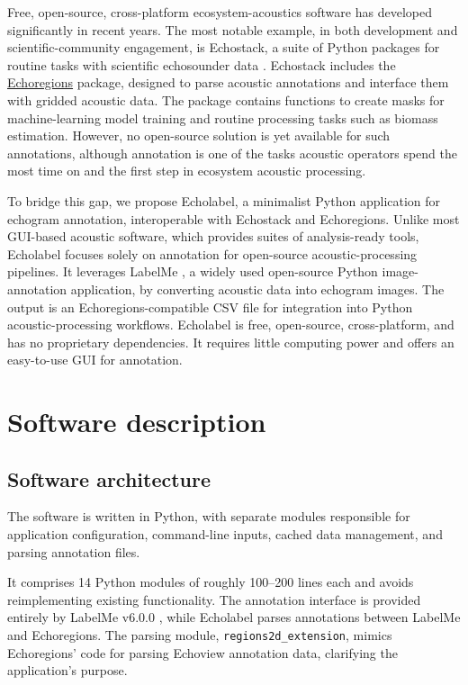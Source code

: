 \documentclass[
  number,
  preprint,
  3p]{elsarticle}
\begin{document}
Free, open-source, cross-platform ecosystem-acoustics software has
developed significantly in recent years. The most notable example, in
both development and scientific-community engagement, is Echostack, a
suite of Python packages for routine tasks with scientific echosounder
data \citep{lee2024, lee2024a}. Echostack includes the
\href{https://github.com/OSOceanAcoustics/echoregions}{Echoregions}
package, designed to parse acoustic annotations and interface them with
gridded acoustic data. The package contains functions to create masks
for machine-learning model training and routine processing tasks such as
biomass estimation. However, no open-source solution is yet available
for such annotations, although annotation is one of the tasks acoustic
operators spend the most time on and the first step in ecosystem
acoustic processing.

To bridge this gap, we propose Echolabel, a minimalist Python
application for echogram annotation, interoperable with Echostack and
Echoregions. Unlike most GUI-based acoustic software, which provides
suites of analysis-ready tools, Echolabel focuses solely on annotation
for open-source acoustic-processing pipelines. It leverages LabelMe
\citep{kentaro}, a widely used open-source Python image-annotation
application, by converting acoustic data into echogram images. The
output is an Echoregions-compatible CSV file for integration into Python
acoustic-processing workflows. Echolabel is free, open-source,
cross-platform, and has no proprietary dependencies. It requires little
computing power and offers an easy-to-use GUI for annotation.

\section{Software description}\label{software-description}

\subsection{Software architecture}\label{software-architecture}

The software is written in Python, with separate modules responsible for
application configuration, command-line inputs, cached data management,
and parsing annotation files.

It comprises 14 Python modules of roughly 100--200 lines each and avoids
reimplementing existing functionality. The annotation interface is
provided entirely by LabelMe v6.0.0 \citep{kentaro2}, while Echolabel
parses annotations between LabelMe and Echoregions. The parsing module,
\texttt{regions2d\_extension}, mimics Echoregions' code for parsing
Echoview annotation data, clarifying the application's purpose.
\end{document}
